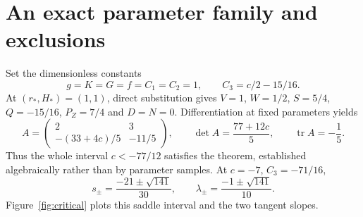 \documentclass[12pt,a4paper,oneside]{report}
\numberwithin{equation}{chapter}
\theoremstyle{remark}\newtheorem{remark}[theorem]{Remark}
\begin{document}
\section{An exact parameter family and exclusions}
Set the dimensionless constants
\begin{equation}\label{eq:example-family}
 g=K=G=f=C_1=C_2=1,\qquad C_3=c/2-15/16.
\end{equation}
At $(r_*,H_*)=(1,1)$, direct substitution gives
$V=1$, $W=1/2$, $S=5/4$, $Q=-15/16$, $P_Z=7/4$ and $D=N=0$.
Differentiation at fixed parameters yields
\begin{equation}\label{eq:example-matrix}
 A=\begin{pmatrix}2&3\\-(33+4c)/5&-11/5\end{pmatrix},\qquad
 \det A=\frac{77+12c}{5},\qquad \operatorname{tr}A=-\frac15.
\end{equation}
Thus the whole interval $c<-77/12$ satisfies the theorem, established
algebraically rather than by parameter samples. At $c=-7$, $C_3=-71/16$,
\begin{equation}\label{eq:exact-slopes}
 s_\pm=\frac{-21\pm\sqrt{141}}{30},\qquad
 \lambda_\pm=\frac{-1\pm\sqrt{141}}{10}.
\end{equation}
Figure~\ref{fig:critical} plots this saddle interval and the two tangent slopes.
\end{document}
